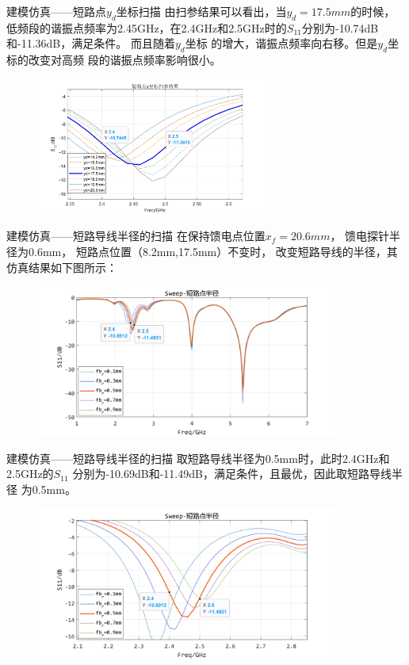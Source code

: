 \documentclass[10pt]{beamer}
\begin{document}
\begin{frame}{建模仿真——{\normalsize 短路点$y_d$坐标扫描}}
	\qquad 由扫参结果可以看出，当$ y_d=17.5mm $的时候，
	低频段的谐振点频率为2.45GHz，在2.4GHz和2.5GHz时的$S_{11}$分别为-10.74dB和-11.36dB，满足条件。
	而且随着$y_d$坐标
	的增大，谐振点频率向右移。但是$y_d$坐标的改变对高频
	段的谐振点频率影响很小。
	\begin{figure}[htbp]
		\centering
		\includegraphics[height=4.5cm]{figs/21.jpg}
	\end{figure}	
\end{frame}


\begin{frame}{建模仿真——{\normalsize 短路导线半径的扫描}}
	\qquad 在保持馈电点位置$x_f=20.6mm$，
	馈电探针半径为0.6mm，
	短路点位置（8.2mm,17.5mm）不变时，
	改变短路导线的半径，其仿真结果如下图所示：
	\begin{figure}[htbp]
		\centering
		\includegraphics[height=5cm]{figs/short.jpg}
		\label{18}
	\end{figure}
\end{frame}
\begin{frame}{建模仿真——{\normalsize 短路导线半径的扫描}}
	\qquad 取短路导线半径为0.5mm时，此时2.4GHz和2.5GHz的$S_{11}$
	分别为-10.69dB和-11.49dB，满足条件，且最优，因此取短路导线半径
	为0.5mm。
	\begin{figure}[htbp]
		\centering
		\includegraphics[height=5cm]{figs/short2.jpg}
		\label{18}
	\end{figure}
\end{frame}
\end{document}
